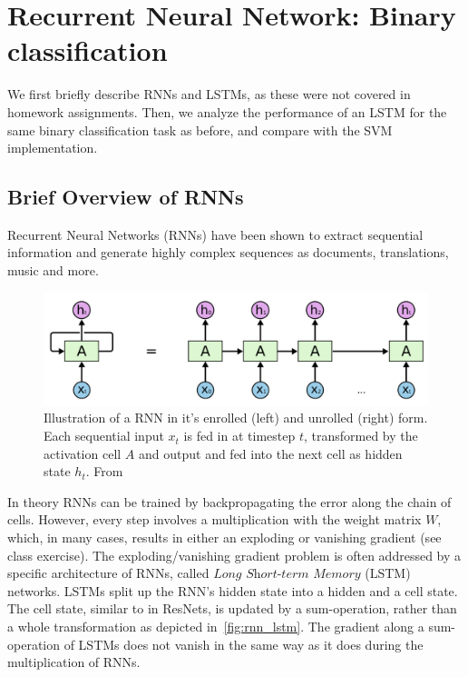 \section{Recurrent Neural Network: Binary classification} \label{sec:rnn_clf}

We first briefly describe RNNs and LSTMs, as these were not covered in homework assignments.
Then, we analyze the performance of an LSTM for the same binary classification task as before, and compare with the SVM implementation.

\subsection{Brief Overview of RNNs}

Recurrent Neural Networks (RNNs) have been shown to extract sequential information and generate highly complex sequences as documents, translations, music and more. 

\begin{figure}
	\centering
	\includegraphics [trim=0 0 0 0, clip, angle=0, width=0.8\columnwidth,
	keepaspectratio]{figures/rnn_unrolled}
	\caption{Illustration of a RNN in it's enrolled (left) and unrolled (right) form. Each sequential input $x_t$ is fed in at timestep $t$, transformed by the activation cell $A$ and output and fed into the next cell as hidden state $h_t$. From~\cite{colah_lstm}} 
	\label{fig:rnn_unrolled} 
\end{figure}

In theory RNNs can be trained by backpropagating the error along the chain of cells.
However, every step involves a multiplication with the weight matrix $W$, which, in many cases, results in either an exploding or vanishing gradient (see class exercise).
The exploding/vanishing gradient problem is often addressed by a specific architecture of RNNs, called $\textit{Long Short-term Memory}$ (LSTM) networks.
LSTMs split up the RNN's hidden state into a hidden and a cell state.
The cell state, similar to in ResNets, is updated by a sum-operation, rather than a whole transformation as depicted in~\cref{fig:rnn_lstm}.
The gradient along a sum-operation of LSTMs does not vanish in the same way as it does during the multiplication of RNNs.

